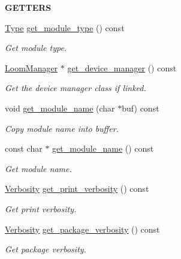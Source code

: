 \begin{Indent}{\bf G\+E\+T\+T\+E\+RS}\par
\begin{DoxyCompactItemize}
\item 
\hyperlink{class_loom_module_aee91d0a75140d51ee428fc2d4417d865}{Type} \hyperlink{class_loom_module_a4e040c36df109bfa39d9499828d3df1d}{get\+\_\+module\+\_\+type} () const 
\begin{DoxyCompactList}\small\item\em Get module type. \end{DoxyCompactList}\item 
\hyperlink{class_loom_manager}{Loom\+Manager} $\ast$ \hyperlink{class_loom_module_a4752224a62f535fbaf3777aa486fc3c5}{get\+\_\+device\+\_\+manager} () const 
\begin{DoxyCompactList}\small\item\em Get the device manager class if linked. \end{DoxyCompactList}\item 
void \hyperlink{class_loom_module_a7ff57ffb2d8fabc484f6678f7fae8082}{get\+\_\+module\+\_\+name} (char $\ast$buf) const 
\begin{DoxyCompactList}\small\item\em Copy module name into buffer. \end{DoxyCompactList}\item 
const char $\ast$ \hyperlink{class_loom_module_a95fbb30f0ab618f3305659f9e7a4bdaf}{get\+\_\+module\+\_\+name} () const 
\begin{DoxyCompactList}\small\item\em Get module name. \end{DoxyCompactList}\item 
\hyperlink{_misc_8h_abf3be10d03894afb391f3a2935e3b313}{Verbosity} \hyperlink{class_loom_module_ab17b0faa49c40c08692714ca6064a8f7}{get\+\_\+print\+\_\+verbosity} () const 
\begin{DoxyCompactList}\small\item\em Get print verbosity. \end{DoxyCompactList}\item 
\hyperlink{_misc_8h_abf3be10d03894afb391f3a2935e3b313}{Verbosity} \hyperlink{class_loom_module_ac259e773fa409b96fa6b43d8edeaa96b}{get\+\_\+package\+\_\+verbosity} () const 
\begin{DoxyCompactList}\small\item\em Get package verbosity. \end{DoxyCompactList}\item 

\end{DoxyCompactItemize}
\end{Indent}
